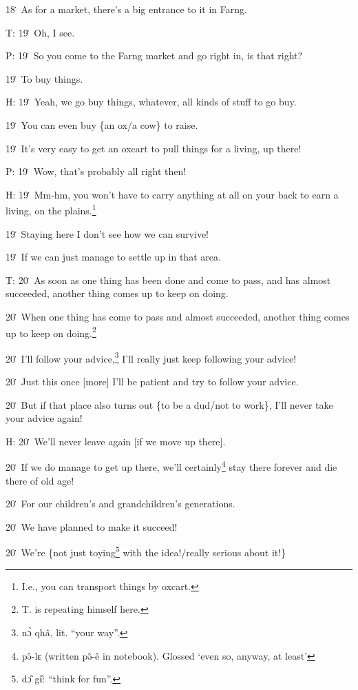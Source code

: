 18\. As for a market, there's a big entrance to it in Farng.

T: 19\. Oh, I see.

P: 19\. So you come to the Farng market and go right in, is that right?

19\. To buy things.

H: 19\. Yeah, we go buy things, whatever, all kinds of stuff to go buy.

19\. You can even buy \{an ox/a cow\} to raise.

19\. It's very easy to get an oxcart to pull things for a living, up there!

P: 19\. Wow, that's probably all right then!

H: 19\. Mm-hm, you won't have to carry anything at all on your back to earn a living,
on the plains.\footnote{I.e., you can transport things by oxcart.}

19\. Staying here I don't see how we can survive!

19\. If we can just manage to settle up in that area.

T: 20\. As soon as one thing has been done and come to pass, and has almost succeeded,
another thing comes up to keep on doing.

20\. When one thing has come to pass and almost succeeded, another thing comes
up to keep on doing.\footnote{T. is repeating himself here.}

20\. I'll follow your advice,\footnote{nɔ̀ qhâ, lit. ``your way''.} I'll really just keep following your advice!

20\. Just this once [more] I'll be patient and try to follow your advice.

20\. But if that place also turns out \{to be a dud/not to work\}, I'll never take
your advice again!

H: 20\. We'll never leave again [if we move up there].

20\. If we do manage to get up there, we'll certainly\footnote{pə̂-lɛ (written pə̂-ê in notebook). Glossed `even so, anyway, at least'} stay there forever and
die there of old age!

20\. For our children's and grandchildren's generations.

20\. We have planned to make it succeed!

20\. We're \{not just toying\footnote{dɔ̂ gɨ̂: ``think for fun''.} with the idea!/really serious about it!\}

